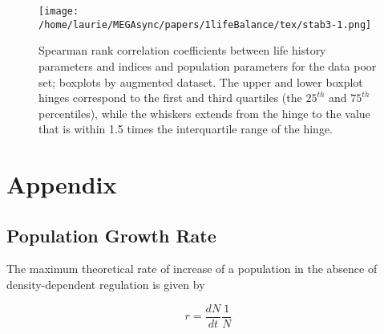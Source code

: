 \documentclass[12pt,doublespacing,a4paper]{ouparticle}
\begin{document}
\begin{figure}[htbp]
\centering
\caption{Spearman rank correlation coefficients between life history parameters and indices and population parameters for the data poor set; boxplots by augmented dataset. The upper and lower boxplot hinges correspond to the first and third quartiles (the $25^{th}$ and $75^{th}$ percentiles), while the whiskers extends from the hinge to the value that is within 1.5 times the interquartile range of the hinge.}
\texttt{[image: /home/laurie/MEGAsync/papers/1lifeBalance/tex/stab3-1.png]}
\label{fig:stab3}
\end{figure}

  



\clearpage
\section{Appendix}

\subsection{Population Growth Rate}

The maximum theoretical rate of increase of a population in the absence of density-dependent regulation is given by

\begin{equation} r=\frac{dN}{dt} \frac{1}{N}  \end{equation}
\end{document}
